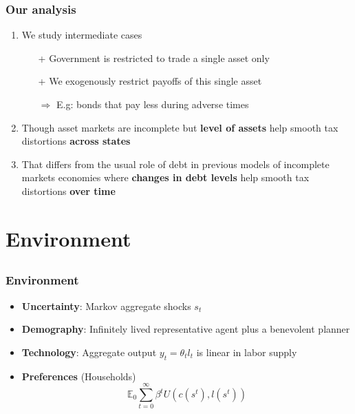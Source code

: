 \documentclass{beamer}
\begin{document}
\begin{frame}
\frametitle{Our analysis}

\begin{enumerate}
\item We study intermediate cases
\begin{itemize}
\item [+] Government is restricted to trade a single asset only
\item [+] We exogenously restrict payoffs of this single asset

 $\Longrightarrow$ E.g: bonds that pay less during adverse times

 \end{itemize}
\item Though asset markets are  incomplete but  {\color{black} \textbf{level of assets} } help smooth tax distortions {\color{black} \textbf{ across  states}}
\item That differs from the usual role of debt in previous models of incomplete markets economies where{ \color{black} \textbf{changes in debt levels}} help smooth tax distortions {\color{black}  \textbf{ over  time}}
\end{enumerate}

\end{frame}


\section{Environment}
\subsection{}

\begin{frame}
 \frametitle{Environment}
 \begin{itemize}
 \item \textbf{Uncertainty}: Markov aggregate shocks $s_t$
  \item \textbf{Demography}: Infinitely lived representative agent plus a benevolent planner
  \item \textbf{Technology}: Aggregate output  $y_t=\theta_{t} l_{t}$ is linear in labor supply
  \item \textbf{Preferences }(Households)
  \begin{equation*}
\mathbb{E}_{0}\sum_{t=0}^{\infty } \beta^t  U\left(
c(s^t),l(s^t)\right)  \label{utility lifetime}
\end{equation*}%
 \end{itemize}

\end{frame}
\end{document}
